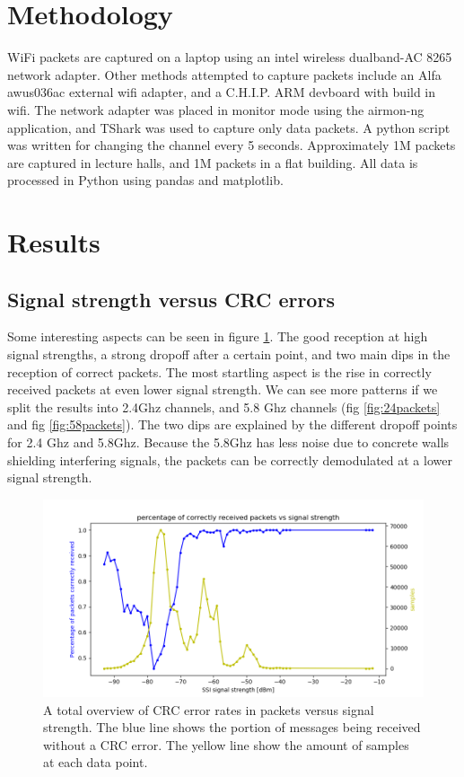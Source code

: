 \documentclass{IEEEtran}
\begin{document}
\section{Methodology}

WiFi packets are captured on a laptop using an intel wireless dualband-AC 8265 network adapter. Other methods attempted to capture packets include an Alfa awus036ac external wifi adapter, and a C.H.I.P. ARM devboard with build in wifi. The network adapter was placed in monitor mode using the airmon-ng application, and TShark was used to capture only data packets. A python script was written for changing the channel every 5 seconds. Approximately 1M packets are captured in lecture halls, and 1M packets in a flat building. All data is processed in Python using pandas and matplotlib.


\section{Results}

\subsection{Signal strength versus CRC errors}

Some interesting aspects can be seen in figure \ref{fig:totalpackets}. The good reception at high signal strengths, a strong dropoff after a certain point, and two main dips in the reception of correct packets. The most startling aspect is the rise in correctly received packets at even lower signal strength. We can see more patterns if we split the results into 2.4Ghz channels, and 5.8 Ghz channels (fig \ref{fig:24packets} and fig \ref{fig:58packets}). The two dips are explained by the different dropoff points for 2.4 Ghz and 5.8Ghz. Because the 5.8Ghz has less noise due to concrete walls shielding interfering signals, the packets can be correctly demodulated at a lower signal strength.

\begin{figure}[tb]
		\includegraphics[width=\textwidth]{figures/packets_total.png}
		\caption{A total overview of CRC error rates in packets versus signal strength. The blue line shows the portion of messages being received without a CRC error. The yellow line show the amount of samples at each data point. }
		\label{fig:totalpackets}
\end{figure}
\end{document}
